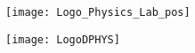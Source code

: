 {%
  \leavevmode%
  \begin{minipage}[.12\textheight]{.4\textwidth}
    \begin{figure}[t]\flushleft\vfill
      \hspace*{.05\textwidth}\texttt{[image: Logo\_Physics\_Lab\_pos]}
    \end{figure}
	\end{minipage}\hfill
	\begin{minipage}[.12\textheight]{.4\textwidth}
    \begin{figure}[t]\flushright\vfill
      \texttt{[image: LogoDPHYS]}\hspace*{.05\textwidth}
    \end{figure}
	\end{minipage}\vspace*{-.01\textheight}
	\begin{center}\VeryHuge
		\textbf{\inserttitle}
	\end{center}
	\hspace*{.05\textwidth}\makebox[.9\textwidth][l]{\rule{.9\textwidth}{.004\textheight}}%
	\vspace*{.01\textheight}
}
